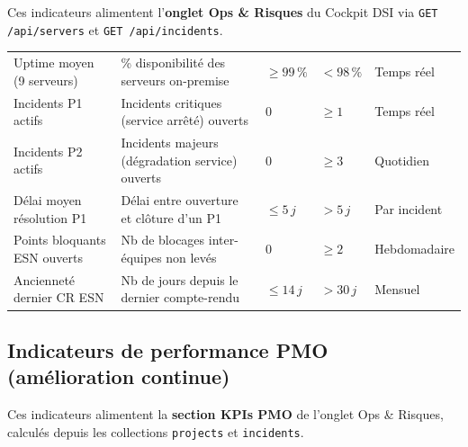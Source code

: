 \documentclass[11pt,a4paper,oneside]{report}
\begin{document}
Ces indicateurs alimentent l'\textbf{onglet Ops \& Risques} du Cockpit DSI via \texttt{GET /api/servers} et \texttt{GET /api/incidents}.

\vspace{4pt}
\begin{center}
\renewcommand{\arraystretch}{1.5}
\begin{tabularx}{\textwidth}{L{4.5cm} L{4cm} C{2cm} C{2cm} L{2cm}}
\toprule
{}
 &  &  &  &  \\
\midrule
Uptime moyen (9 serveurs) & \% disponibilité des serveurs on-premise & $\geq 99\,\%$ & $< 98\,\%$ & Temps réel \\
Incidents P1 actifs & Incidents critiques (service arrêté) ouverts & 0 & $\geq 1$ & Temps réel \\
Incidents P2 actifs & Incidents majeurs (dégradation service) ouverts & 0 & $\geq 3$ & Quotidien \\
Délai moyen résolution P1 & Délai entre ouverture et clôture d'un P1 & $\leq 5\,j$ & $> 5\,j$ & Par incident \\
Points bloquants ESN ouverts & Nb de blocages inter-équipes non levés & 0 & $\geq 2$ & Hebdomadaire \\
Ancienneté dernier CR ESN & Nb de jours depuis le dernier compte-rendu & $\leq 14\,j$ & $> 30\,j$ & Mensuel \\
\bottomrule
\end{tabularx}
\end{center}

\subsection{Indicateurs de performance PMO (amélioration continue)}

Ces indicateurs alimentent la \textbf{section KPIs PMO} de l'onglet Ops \& Risques, calculés depuis les collections \texttt{projects} et \texttt{incidents}.
\end{document}
